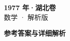 \documentclass[zihao=-4, a4paper]{ctexart}
\begin{document}
\begin{center}
  {\Large\bfseries 1977 年·湖北卷}\\[4pt]
  {\large 数学 · 解析版}
\end{center}
\medskip
{}

\clearpage
{}
\begin{center}{\Large\bfseries 参考答案与详细解析}\end{center}
\medskip

\end{document}
